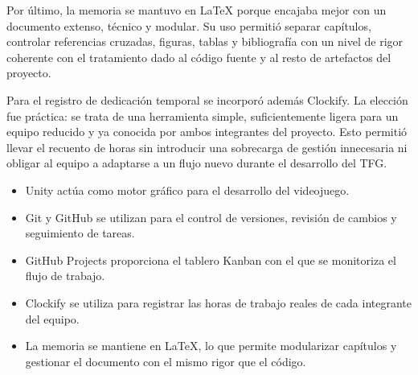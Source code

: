 Por último, la memoria se mantuvo en LaTeX porque encajaba mejor con un documento extenso,
técnico y modular. Su uso permitió separar capítulos, controlar referencias cruzadas,
figuras, tablas y bibliografía con un nivel de rigor coherente con el tratamiento dado al
código fuente y al resto de artefactos del proyecto.

Para el registro de dedicación temporal se incorporó además Clockify. La elección fue
práctica: se trata de una herramienta simple, suficientemente ligera para un equipo
reducido y ya conocida por ambos integrantes del proyecto. Esto permitió llevar el
recuento de horas sin introducir una sobrecarga de gestión innecesaria ni obligar al
equipo a adaptarse a un flujo nuevo durante el desarrollo del TFG.

\begin{itemize}
    \item Unity actúa como motor gráfico para el desarrollo del videojuego.
    \item Git y GitHub se utilizan para el control de versiones, revisión de cambios y seguimiento de tareas.
    \item GitHub Projects proporciona el tablero Kanban con el que se monitoriza el flujo de trabajo.
    \item Clockify se utiliza para registrar las horas de trabajo reales de cada integrante del equipo.
    \item La memoria se mantiene en LaTeX, lo que permite modularizar capítulos y gestionar el documento con el mismo rigor que el código.
\end{itemize}
